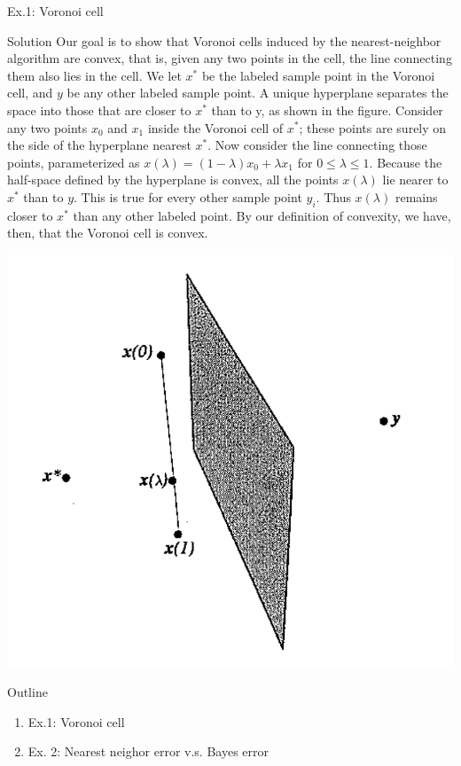 \documentclass[compress,blue]{beamer}
\begin{document}
\begin{frame}{Ex.1: Voronoi cell}
	\scriptsize
	\begin{block}{Solution}
		Our goal is to show that Voronoi cells induced by the nearest-neighbor algorithm are convex, that is, given any two points in the cell, the line connecting them also lies in the cell. We let $x^*$ be the labeled sample point in the Voronoi cell, and $y$ be any other labeled sample point. A unique hyperplane separates the space into those that are closer to $x^*$ than to y, as shown in the figure. Consider any two points $x_0$ and $x_1$ inside the Voronoi cell of $x^*$; these points are surely on the side of the hyperplane nearest $x^*$. Now consider the line connecting those points, parameterized as $x(\lambda) = (1-\lambda)x_0 + \lambda x_1$ for $0\leq \lambda \leq 1$. Because the half-space defined by the hyperplane is convex, all the points $x(\lambda)$ lie nearer to $x^*$ than to $y$. This is true for every other sample point $y_i$. Thus $x(\lambda)$ remains closer to $x^*$ than any other labeled point. By our definition of convexity, we have, then, that the Voronoi cell is convex. 
	\end{block}
	\centering
	\includegraphics[width=0.35\linewidth]{figures/ex1s.png}
\end{frame}

\begin{frame}{Outline}
	\begin{enumerate}
		\item<0> Ex.1: Voronoi cell
		\vspace{0.1in}
		\item<1> Ex. 2: Nearest neighor error v.s. Bayes error
	\end{enumerate}
\end{frame}
\end{document}
